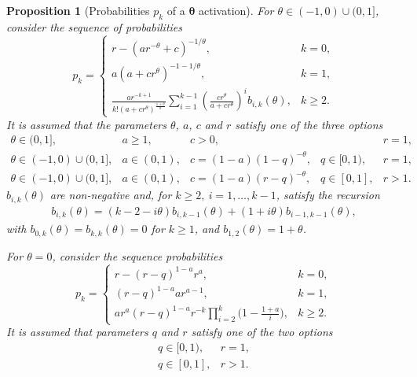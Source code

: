 \documentclass[final, 12pt]{colt2021} %
\newtheorem{prop}{Proposition}
\begin{document}
\begin{prop}[Probabilities $p_k$ of a $\boldsymbol{\theta}$ activation]
\label{prop:p_k_of_theta_activation}
For $\theta \in (-1, 0) \cup (0, 1]$, consider
the sequence of probabilities
\begin{equation}\label{eq:probMain}
p_k =
\left\{
\begin{array}{ll}
r-(ar^{-\theta}+c)^{-1/\theta},  & k = 0,\\
a (a+cr^{\theta})^{-1-1/\theta}, & k = 1,\\
\frac{ar^{-k+1}}{k!(a+cr^{\theta})^{\frac{1+\theta}{\theta}}}
\displaystyle\sum_{i=1}^{k-1}\left(\frac{cr^{\theta}}{a+cr^{\theta}}\right)^{i}b_{i,k}(\theta),
& k \ge 2.
\end{array}
\right.
\end{equation}
It is assumed that the parameters $\theta$, $a$, $c$ and $r$
satisfy one of the three options
\begin{equation*}
\begin{array}{llllll}
\theta\in(0,1], & a\ge1,  & c>0, & & r=1,\\
\theta \in (-1, 0) \cup (0, 1], & a\in(0,1),&  c=(1-a) (1-q)^{-\theta}, &q\in[0,1), & r=1,\\
\theta \in (-1, 0) \cup (0, 1], & a\in(0,1),&  c=(1-a) (r-q)^{-\theta}, &q\in[0,1], & r>1.
\end{array}
\end{equation*}
$b_{i,k}(\theta)$ are non-negative and, for $k\ge2,~i=1,\ldots, k-1$, satisfy the recursion
\begin{align*}
b_{i,k}(\theta)=(k-2-i\theta)b_{i,k-1}(\theta)+(1+i\theta)b_{i-1,k-1}(\theta),
\end{align*}
 with
 $b_{0,k}(\theta)=
 b_{k,k}(\theta)
 =0$ for $k\ge1$, and
 $b_{1,2}(\theta)=1+\theta$.

For $\theta=0$, consider the sequence probabilities
\begin{equation}\label{eq:probZero}
p_k =
\left\{
\begin{array}{ll}
r-(r-q)^{1-a}r^{a},  & k = 0,\\
(r-q)^{1-a} ar^{a-1}, & k = 1,\\
ar^{a}(r-q)^{1-a} r^{-k}
\displaystyle\prod_{i=2}^k\Big(1-\frac{1 + a}{i}\Big),
& k \ge 2.
\end{array}
\right.
\end{equation}
It is assumed that parameters $q$ and $r$ satisfy one of the two options
\begin{equation*}
\begin{array}{ll}
q \in [0, 1), & r = 1, \\
q \in [0, 1], & r > 1.
\end{array}
\end{equation*}


\end{prop}
\end{document}
